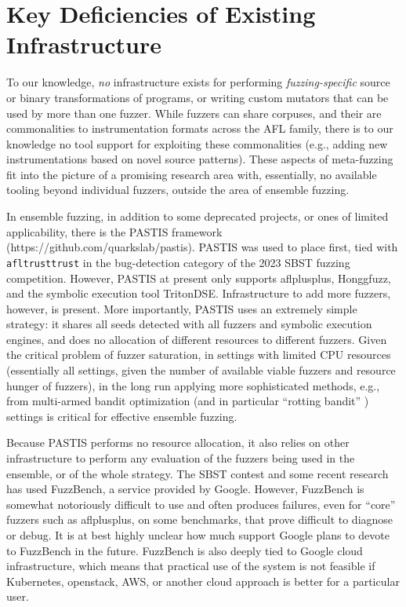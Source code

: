 \section{Key Deficiencies of Existing Infrastructure}

To our knowledge, \emph{no} infrastructure exists for performing 
\emph{fuzzing-specific} source or binary transformations of programs, or writing 
custom mutators that can be used by more than one fuzzer.  While
fuzzers can share corpuses, and their are commonalities to
instrumentation formats across the AFL family, there is to our
knowledge no tool support for exploiting these commonalities (e.g.,
adding new instrumentations based on novel source patterns).  These aspects of meta-fuzzing fit into the picture of a promising 
research area with, essentially, no available tooling beyond individual 
fuzzers, outside the area of ensemble fuzzing.

In ensemble fuzzing, in addition to some deprecated projects, or ones of 
limited applicability, there is the PASTIS framework 
(https://github.com/quarkslab/pastis).  PASTIS was used to place first, tied 
with {\tt afltrusttrust} in the bug-detection category of the 2023 SBST fuzzing 
competition.  However, PASTIS at present only supports aflplusplus, Honggfuzz, 
and the symbolic execution tool TritonDSE.  Infrastructure to add more fuzzers, 
however, is present.  More importantly, PASTIS uses an extremely simple 
strategy:  it shares all seeds detected with all fuzzers and symbolic execution 
engines, and does no allocation of different resources to different fuzzers.  
Given the critical problem of fuzzer saturation, in settings with limited CPU 
resources (essentially all settings, given the number of available viable 
fuzzers and resource hunger of fuzzers), in the long run applying more 
sophisticated methods, e.g., from multi-armed bandit optimization (and in 
particular ``rotting bandit'' \cite{}) settings is critical for effective 
ensemble fuzzing.

Because PASTIS performs no resource allocation, it also relies on other 
infrastructure to perform any evaluation of the fuzzers being used in the 
ensemble, or of the whole strategy.  The SBST contest and some recent research 
has used FuzzBench, a service provided by Google.  However, FuzzBench is 
somewhat notoriously difficult to use and often produces failures, even for 
``core'' fuzzers such as aflplusplus, on some benchmarks, that prove difficult 
to diagnose or debug.  It is at best highly unclear how much support Google 
plans to devote to FuzzBench in the future.  FuzzBench is also deeply
tied to Google cloud infrastructure, which means that practical use of
the system is not feasible if Kubernetes, openstack, AWS, or another
cloud approach is better for a particular user.

